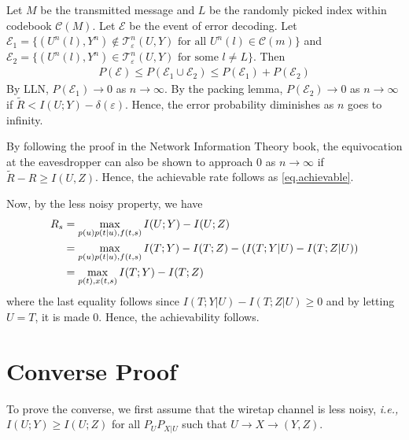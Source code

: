\documentclass[12pt, Draft, onecolumn]{IEEEtran}
\def\ie{{\it i.e., }}
\def\calC{{\mathcal{C}}}
\def\calE{{\mathcal{E}}}
\def\calT{{\mathcal{T}}}
\begin{document}
Let $M$ be the transmitted message and $L$ be the randomly picked index within codebook $\calC(M)$. Let $\calE$ be the event of error decoding. Let $\calE_1=\{(U^n(l), Y^n)\notin\calT^n_{\varepsilon}(U,Y) \text{ for all $U^n(l)\in \calC(m)$}\}$ and $\calE_2=\{(U^n(l), Y^n)\in\calT^n_{\varepsilon}(U,Y) \text{ for some $l\neq L$}\}$. Then
\begin{align*}
P(\calE)\leq P(\calE_1\cup\calE_2) \leq P(\calE_1)+P(\calE_2)
\end{align*}
By LLN, $P(\calE_1)\rightarrow 0$ as $n\rightarrow \infty$. By the packing lemma, $P(\calE_2)\rightarrow 0$ as $n\rightarrow \infty$ if $\tilde{R}<I(U;Y)-\delta(\varepsilon)$. Hence, the error probability diminishes as $n$ goes to infinity.

By following the proof in the Network Information Theory book, the equivocation at the eavesdropper can also be shown to approach $0$ as $n\rightarrow \infty$ if $\tilde{R}-R\geq I(U,Z)$. Hence, the achievable rate follows as \eqref{eq.achievable}.

Now, by the less noisy property, we have
\begin{align}
R_s &= \max_{p(u)p(t|u),f(t,s)} I(U;Y)-I(U;Z)\notag\\
&= \max_{p(u)p(t|u),f(t,s)} I(T;Y)-I(T;Z)-(I(T;Y|U)-I(T;Z|U))\notag\\
&= \max_{p(t),x(t,s)} I(T;Y)-I(T;Z)
\end{align}
where the last equality follows since $I(T;Y|U)-I(T;Z|U)\geq 0$ and by letting $U=T$, it is made $0$. Hence, the achievability follows.

\section{Converse Proof}
To prove the converse, we first assume that the wiretap channel is less noisy, \ie $I(U;Y)\geq I(U;Z)$ for all $P_UP_{X|U}$ such that $U\rightarrow X\rightarrow (Y,Z)$.
\end{document}
